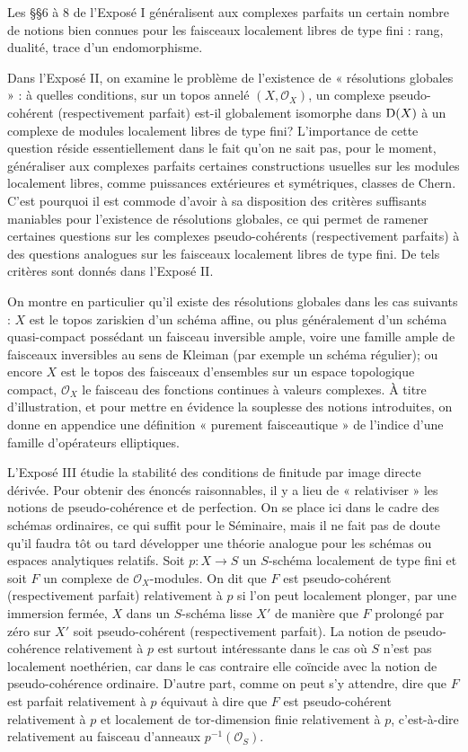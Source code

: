 \documentclass[11pt]{article}
\begin{document}
Les §§6 à 8 de l'Exposé I généralisent aux complexes parfaits un certain nombre de notions bien connues pour les faisceaux localement libres de type fini : rang, dualité, trace d'un endomorphisme.

Dans l'Exposé II, on examine le problème de l'existence de « résolutions globales » : à quelles conditions, sur un topos annelé \((X,\mathcal O_X)\), un complexe pseudo-cohérent (respectivement parfait) est-il globalement isomorphe dans \(\mathrm D(X)\) à un complexe de modules localement libres de type fini? L'importance de cette question réside essentiellement dans le fait qu'on ne sait pas, pour le moment, généraliser aux complexes parfaits certaines constructions usuelles sur les modules localement libres, comme puissances extérieures et symétriques, classes de Chern. C'est pourquoi il est commode d'avoir à sa disposition des critères suffisants maniables pour l'existence de résolutions globales, ce qui permet de ramener certaines questions sur les complexes pseudo-cohérents (respectivement parfaits) à des questions analogues sur les faisceaux localement libres de type fini. De tels critères sont donnés dans l'Exposé II.

On montre en particulier qu'il existe des résolutions globales dans les cas suivants : \(X\) est le topos zariskien d'un schéma affine, ou plus généralement d'un schéma quasi-compact possédant un faisceau inversible ample, voire une famille ample de faisceaux inversibles au sens de Kleiman (par exemple un schéma régulier); ou encore \(X\) est le topos des faisceaux d'ensembles sur un espace topologique compact, \(\mathcal O_X\) le faisceau des fonctions continues à valeurs complexes. À titre d'illustration, et pour mettre en évidence la souplesse des notions introduites, on donne en appendice une définition « purement faisceautique » de l'indice d'une famille d'opérateurs elliptiques.

L'Exposé III étudie la stabilité des conditions de finitude par image directe dérivée. Pour obtenir des énoncés raisonnables, il y a lieu de « relativiser » les notions de pseudo-cohérence et de perfection. On se place ici dans le cadre des schémas ordinaires, ce qui suffit pour le Séminaire, mais il ne fait pas de doute qu'il faudra tôt ou tard développer une théorie analogue pour les schémas ou espaces analytiques relatifs. Soit \(p:X\to S\) un \(S\)-schéma localement de type fini et soit \(F\) un complexe de \(\mathcal O_X\)-modules. On dit que \(F\) est pseudo-cohérent (respectivement parfait) relativement à \(p\) si l'on peut localement plonger, par une immersion fermée, \(X\) dans un \(S\)-schéma lisse \(X'\) de manière que \(F\) prolongé par zéro sur \(X'\) soit pseudo-cohérent (respectivement parfait). La notion de pseudo-cohérence relativement à \(p\) est surtout intéressante dans le cas où \(S\) n'est pas localement noethérien, car dans le cas contraire elle coïncide avec la notion de pseudo-cohérence ordinaire. D'autre part, comme on peut s'y attendre, dire que \(F\) est parfait relativement à \(p\) équivaut à dire que \(F\) est pseudo-cohérent relativement à \(p\) et localement de tor-dimension finie relativement à \(p\), c'est-à-dire relativement au faisceau d'anneaux \(p^{-1}(\mathcal O_S)\).
\end{document}
